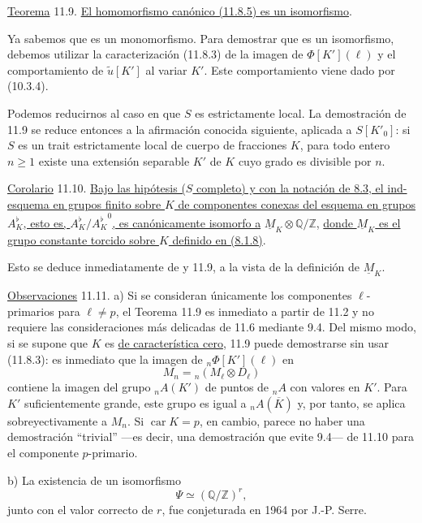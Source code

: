 
\medskip
\noindent
\underline{Teorema} 11.9. \underline{El homomorfismo canónico (11.8.5)
es un isomorfismo}.

Ya sabemos que es un monomorfismo. Para demostrar que es un
isomorfismo, debemos utilizar la caracterización (11.8.3) de la imagen
de $\Phi[K'](\ell)$ y el comportamiento de $\widetilde u[K']$ al variar
$K'$. Este comportamiento viene dado por (10.3.4).

Podemos reducirnos al caso en que $S$ es estrictamente local. La
demostración de 11.9 se reduce entonces a la afirmación conocida
siguiente, aplicada a $S[K'_0]$: si $S$ es un trait estrictamente local
de cuerpo de fracciones $K$, para todo entero $n\geq1$ existe una
extensión separable $K'$ de $K$ cuyo grado es divisible por
$n$.

\medskip
\noindent
\underline{Corolario} 11.10. \underline{Bajo las hipótesis ($S$
completo) y con la notación de 8.3, el ind-esquema en grupos finito
sobre $K$ de componentes conexas del esquema en grupos $A_K^{\flat}$,
esto es, $A_K^{\flat}/{A_K^{\flat}}^0$, es canónicamente isomorfo a}
$\underline M_K\otimes\mathbb Q/\mathbb Z$, \underline{donde
$\underline M_K$ es el grupo constante torcido sobre $K$ definido en
(8.1.8)}.

Esto se deduce inmediatamente de  y 11.9, a la vista de la
definición de $\underline M_K$.


\medskip
\noindent
\underline{Observaciones} 11.11. a) Si se consideran únicamente los
componentes $\ell$-primarios para $\ell\neq p$, el Teorema 11.9 es
inmediato a partir de 11.2 y no requiere las consideraciones más
delicadas de 11.6 mediante 9.4. Del mismo modo, si se supone que $K$ es
\underline{de característica cero}, 11.9 puede demostrarse sin usar
(11.8.3): es inmediato que la imagen de ${}_n\Phi[K'](\ell)$ en
\begin{equation*}
 M_n={}_n(M_\ell\otimes D_\ell)
\end{equation*}
contiene la imagen del grupo ${}_nA(K')$ de puntos de ${}_nA$ con
valores en $K'$. Para $K'$ suficientemente grande, este grupo es igual
a ${}_nA(\overline K)$ y, por tanto, se aplica sobreyectivamente a
$M_n$. Si $\operatorname{car}K=p$, en cambio, parece no haber una
demostración ``trivial'' —es decir, una demostración que evite 9.4— de
11.10 para el componente $p$-primario.

b) La existencia de un isomorfismo
\begin{equation*}
 \Psi\simeq(\mathbb Q/\mathbb Z)^r,
\end{equation*}
junto con el valor correcto de $r$, fue conjeturada en 1964 por
J.-P. Serre.
